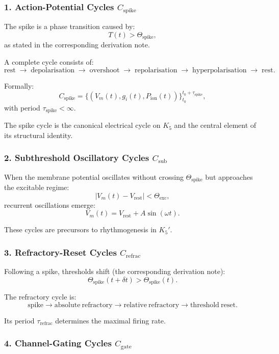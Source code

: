 \subsubsection{1. Action-Potential Cycles $C_{\mathrm{spike}}$}

The spike is a phase transition caused by:
\[
  T(t) > \Theta_{\mathrm{spike}},
\]
as stated in the corresponding derivation note.

A complete cycle consists of:
\[
  \mathrm{rest} 
  \;\to\;
  \mathrm{depolarisation}
  \;\to\;
  \mathrm{overshoot}
  \;\to\;
  \mathrm{repolarisation}
  \;\to\;
  \mathrm{hyperpolarisation}
  \;\to\;
  \mathrm{rest}.
\]

Formally:
\[
  C_{\mathrm{spike}}
  =\{(V_m(t), g_i(t), P_{\mathrm{ion}}(t))\}_{t_0}^{t_0+\tau_{\mathrm{spike}}},
\]
with period $\tau_{\mathrm{spike}} < \infty$.

The spike cycle is the canonical electrical cycle on $K_5$ and the 
central element of its structural identity.

\subsubsection{2. Subthreshold Oscillatory Cycles $C_{\mathrm{sub}}$}

When the membrane potential oscillates without crossing 
$\Theta_{\mathrm{spike}}$ but approaches the excitable regime:
\[
  |V_m(t) - V_{\mathrm{rest}}| < \Theta_{\mathrm{exc}},
\]
recurrent oscillations emerge:
\[
  V_m(t) = V_{\mathrm{rest}} + A\sin(\omega t).
\]

These cycles are precursors to rhythmogenesis in $K_5'$.

\subsubsection{3. Refractory-Reset Cycles $C_{\mathrm{refrac}}$}

Following a spike, thresholds shift (the corresponding derivation note):
\[
  \Theta_{\mathrm{spike}}(t+\delta t)
  >
  \Theta_{\mathrm{spike}}(t).
\]

The refractory cycle is:
\[
  \mathrm{spike} 
  \to 
  \mathrm{absolute\ refractory}
  \to
  \mathrm{relative\ refractory}
  \to
  \mathrm{threshold\ reset}.
\]

Its period $\tau_{\mathrm{refrac}}$ determines the maximal firing rate.

\subsubsection{4. Channel-Gating Cycles $C_{\mathrm{gate}}$}

